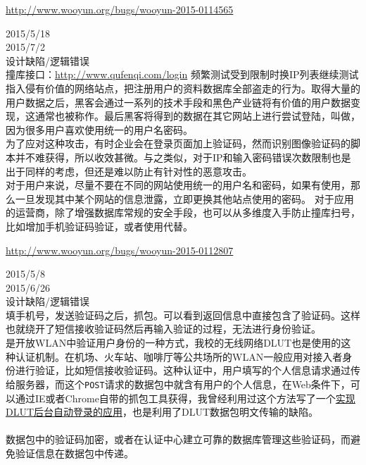 \documentclass{leptc}
\begin{document}
\begin{center}
	\url{http://www.wooyun.org/bugs/wooyun-2015-0114565}
\end{center}
 2015/5/18 \\
 2015/7/2 \\
 设计缺陷/逻辑错误 \\
 撞库接口：\url{http://www.qufenqi.com/login} 频繁测试受到限制时换IP列表继续测试\\
 指入侵有价值的网络站点，把注册用户的资料数据库全部盗走的行为。取得大量的用户数据之后，黑客会通过一系列的技术手段和黑色产业链将有价值的用户数据变现，这通常也被称作。最后黑客将得到的数据在其它网站上进行尝试登陆，叫做，因为很多用户喜欢使用统一的用户名密码。\\
为了应对这种攻击，有时企业会在登录页面加上验证码，然而识别图像验证码的脚本并不难获得，所以收效甚微。与之类似，对于IP和输入密码错误次数限制也是出于同样的考虑，但还是难以防止有针对性的恶意攻击。\\
  对于用户来说，尽量不要在不同的网站使用统一的用户名和密码，如果有使用，那么一旦发现其中某个网站的信息泄露，立即更换其他站点使用的密码。 对于应用的运营商，除了增强数据库常规的安全手段，也可以从多维度入手防止撞库扫号，比如增加手机验证码验证，或者使用代替。\\
\begin{center}

\end{center}

\label{attention}
\begin{center}
	\url{http://www.wooyun.org/bugs/wooyun-2015-0112807}
\end{center}
 2015/5/8 \\
 2015/6/26 \\
 设计缺陷/逻辑错误 \\
 填手机号，发送验证码之后，抓包。可以看到返回信息中直接包含了验证码。这样也就绕开了短信接收验证码然后再输入验证的过程，无法进行身份验证。\\
 是开放WLAN中验证用户身份的一种方式，我校的无线网络DLUT也是使用的这种认证机制。在机场、火车站、咖啡厅等公共场所的WLAN一般应用对接入者身份进行验证，比如短信接收验证码。这种认证中，用户填写的个人信息请求通过传给服务器，而这个\verb|POST|请求的数据包中就含有用户的个人信息，在Web条件下，可以通过IE或者Chrome自带的抓包工具获得，我曾经利用过这个方法写了一个\href{https://github.com/Lixinyi-DUT/WirelessHelper}{实现DLUT后台自动登录的应用}，也是利用了DLUT数据包明文传输的缺陷。\\
\\
 数据包中的验证码加密，或者在认证中心建立可靠的数据库管理这些验证码，而避免验证信息在数据包中传递。\\
\end{document}
